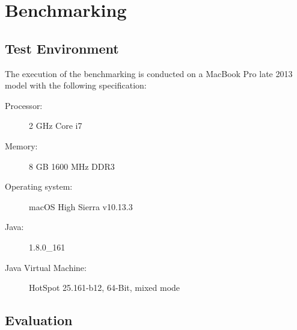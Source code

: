 \chapter{Benchmarking}


\section{Test Environment}
The execution of the benchmarking is conducted on a MacBook Pro late 2013 model with the following specification:

\begin{description}
  \item [Processor:] 2 GHz Core i7
  \item [Memory:] 8 GB 1600 MHz DDR3
  \item [Operating system:] macOS High Sierra v10.13.3
  \item [Java:] 1.8.0\_161
  \item [Java Virtual Machine:] HotSpot 25.161-b12, 64-Bit, mixed mode
\end{description}


\section{Evaluation}
